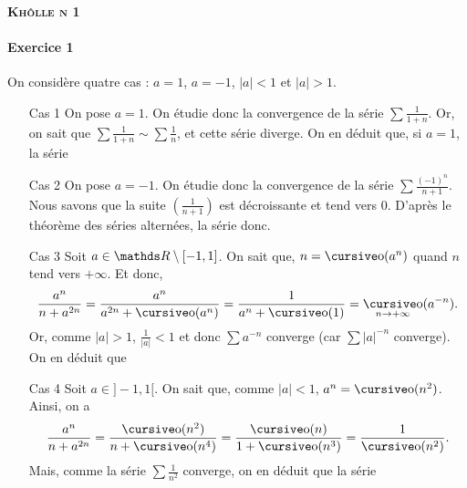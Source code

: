 \documentclass[a4paper]{article}
\begin{document}
	\begin{center}
		\bfseries\scshape\Huge Khôlle n 1
	\end{center}

	\paragraph{Exercice 1}
	On considère quatre cas : $a = 1$, $a = -1$, $|a| < 1$\/ et $|a| > 1$.
	\begin{itemize}
		\item[{\sc Cas 1}] On pose $a = 1$. On étudie donc la convergence de la série $\sum \frac{1}{1+n}$. Or, on sait que $\sum \frac{1}{1+n} \sim \sum \frac{1}{n}$, et cette série diverge. On en déduit que, si $a = 1$, la série 
		\item[{\sc Cas 2}] On pose $a = -1$. On étudie donc la convergence de la série $\sum \frac{(-1)^n}{n + 1}$. Nous savons que la suite $\left( \frac{1}{n+1} \right)$\/ est décroissante et tend vers 0. D'après le théorème des séries alternées, la série  donc.
		\item[{\sc Cas 3}] Soit $a \in \R \setminus [-1,1]$.
			On sait que, $n = \po(a^n)$\/ quand $n$\/ tend vers $+\infty$. Et donc, \[
				\frac{a^n}{n + a^{2n}} = \frac{a^n}{a^{2n} + \po(a^n)} = \frac{1}{a^n + \po(1)} = \po_{n\to +\infty}(a^{-n})
			.\] Or, comme $|a| > 1$, $\frac{1}{|a|} < 1$\/ et donc $\sum a^{-n}$\/ converge (car $\sum |a|^{-n}$\/ converge). On en déduit que 
		\item[{\sc Cas 4}] Soit $a \in {]-1,1[}$. On sait que, comme $|a| < 1$, $a^n = \po(n^2)$. Ainsi, on a \[
			\frac{a^n}{n + a^{2n}} = \frac{\po(n^2)}{n + \po(n^4)} = \frac{\po(n)}{1 + \po(n^3)} = \frac{1}{\po(n^2)}
		.\] Mais, comme la série $\sum \frac{1}{n^2}$\/ converge, on en déduit que la série 
	\end{itemize}
	\bigskip
	\bigskip
\end{document}

